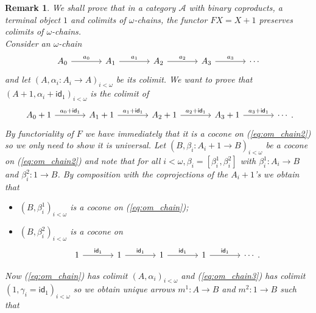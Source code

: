 \documentclass[letterpaper, 11pt, oneside]{memoir}
\theoremstyle{myteo}
\newtheorem{remark}[theorem]{Remark}
\numberwithin{equation}{section}
\newcommand{\id}{\textsf{id}}
\newcommand{\A}{\mathscr{A}}
\begin{document}
\begin{remark}
  \label{rem:omega_preservation}
  We shall prove that in a category \(\A\) with binary coproducts, a terminal object \(1\) and colimits of \(\omega\)-chains, the functor \(FX = X + 1\) preserves colimits of \(\omega\)-chains.\\

  Consider an \(\omega\)-chain
  \begin{equation}
    \label{eq:om_chain}
    \begin{tikzcd}[sep = large]
      A_0 \ar[r, "a_0"] & A_1 \ar[r, "a_1"] & A_2 \ar[r, "a_2"] & A_3 \ar[r, "a_3"] & \cdots
    \end{tikzcd}
  \end{equation}
  and let \((A, \alpha_i:A_i \to A)_{i < \omega}\) be its colimit.
  We want to prove that \((A + 1, \alpha_i + \id_1)_{i<\omega}\) is the colimit of
  \begin{equation}
    \label{eq:om_chain2}
    \begin{tikzcd}[sep = large]
      A_0 + 1 \ar[r, "a_0 + \id_1"] & A_1 +1 \ar[r, "a_1 + \id_1"] & A_2 + 1 \ar[r, "a_2 + \id_1"] & A_3 + 1 \ar[r, "a_3 + \id_1"] & \cdots
    \end{tikzcd}.
  \end{equation}
  By functoriality of \(F\) we have immediately that it is a cocone on (\ref{eq:om_chain2}) so we only need to show it is universal.
  Let \((B, \beta_i: A_i + 1 \to B)_{i<\omega}\) be a cocone on (\ref{eq:om_chain2}) and note that for all \(i < \omega, \beta_i = [\beta_i^1, \beta_i^2]\) with \(\beta_i^1:A_i \to B\) and \(\beta_i^2: 1 \to B\).
  By composition with the coprojections of the \(A_i + 1\)'s we obtain that
  \begin{itemize}
  \item[1.] \((B, \beta_i^1)_{i<\omega}\) is a cocone on (\ref{eq:om_chain});
  \item[2.] \((B, \beta_i^2)_{i<\omega}\) is a cocone on
    \begin{equation}
      \label{eq:om_chain3}
      \begin{tikzcd}[sep = large]
        1 \ar[r, "\id_1"] & 1 \ar[r, "\id_1"] & 1 \ar[r, "\id_1"] & 1 \ar[r, "\id_1"] & \cdots
      \end{tikzcd}.
    \end{equation}
  \end{itemize}
  Now (\ref{eq:om_chain}) has colimit \((A, \alpha_i)_{i<\omega}\) and (\ref{eq:om_chain3}) has colimit \((1, \gamma_i = \id_1)_{i<\omega}\) so we obtain unique arrows \(m^1 : A \to B \) and \(m^2:1 \to B\) such that

\end{remark}
\end{document}
